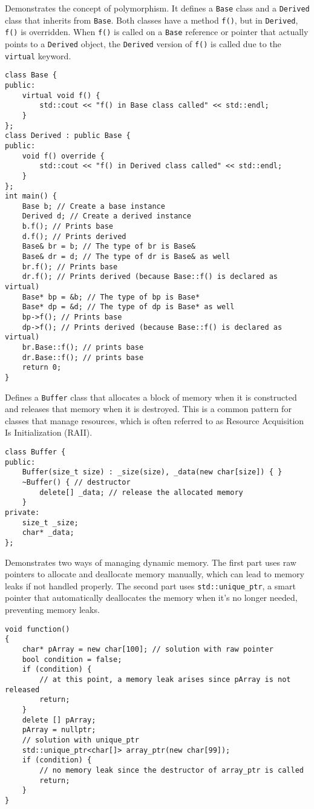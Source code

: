 Demonstrates the concept of polymorphism. It defines a \texttt{Base} class and a
\texttt{Derived} class that inherits from \texttt{Base}. Both classes have a method \texttt{f()},
but in \texttt{Derived}, \texttt{f()} is overridden. When \texttt{f()} is called on a \texttt{Base}
reference or pointer that actually points to a \texttt{Derived} object, the \texttt{Derived}
version of \texttt{f()} is called due to the \texttt{virtual} keyword.
\begin{verbatim}
class Base {
public:
    virtual void f() {
        std::cout << "f() in Base class called" << std::endl;
    }
};
class Derived : public Base {
public:
    void f() override {
        std::cout << "f() in Derived class called" << std::endl;
    }
};
int main() {
    Base b; // Create a base instance
    Derived d; // Create a derived instance
    b.f(); // Prints base
    d.f(); // Prints derived
    Base& br = b; // The type of br is Base&
    Base& dr = d; // The type of dr is Base& as well
    br.f(); // Prints base
    dr.f(); // Prints derived (because Base::f() is declared as virtual)
    Base* bp = &b; // The type of bp is Base*
    Base* dp = &d; // The type of dp is Base* as well
    bp->f(); // Prints base
    dp->f(); // Prints derived (because Base::f() is declared as virtual)
    br.Base::f(); // prints base
    dr.Base::f(); // prints base
    return 0;
}
\end{verbatim}

Defines a \texttt{Buffer} class that allocates a block of memory when it is
constructed and releases that memory when it is destroyed. This is a common pattern for classes
that manage resources, which is often referred to as Resource Acquisition Is Initialization (RAII).
\begin{verbatim}
class Buffer {
public:
    Buffer(size_t size) : _size(size), _data(new char[size]) { }
    ~Buffer() { // destructor
        delete[] _data; // release the allocated memory
    }
private:
    size_t _size;
    char* _data;
};
\end{verbatim}

Demonstrates two ways of managing dynamic memory. The first part uses raw pointers to
allocate and deallocate memory manually, which can lead to memory leaks if not handled properly.
The second part uses \texttt{std::unique\_ptr}, a smart pointer that automatically deallocates the
memory when it's no longer needed, preventing memory leaks.
\begin{verbatim}
void function()
{
    char* pArray = new char[100]; // solution with raw pointer
    bool condition = false;
    if (condition) {
        // at this point, a memory leak arises since pArray is not released
        return;
    }
    delete [] pArray;
    pArray = nullptr;
    // solution with unique_ptr
    std::unique_ptr<char[]> array_ptr(new char[99]);
    if (condition) {
        // no memory leak since the destructor of array_ptr is called
        return;
    }
}
\end{verbatim}

